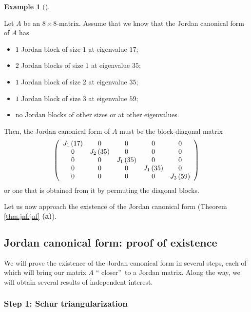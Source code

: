 \documentclass[numbers=enddot,12pt,final,onecolumn,notitlepage]{scrartcl}%
\numberwithin{exer}{subsection}
\theoremstyle{definition}
\newtheorem{exam}[theo]{Example}
\newenvironment{example}[1][]
{\begin{exam}[#1]\begin{leftbar}}
{\end{leftbar}\end{exam}}
\begin{document}
\begin{example}
Let $A$ be an $8\times8$-matrix. Assume that we know that the Jordan canonical
form of $A$ has

\begin{itemize}
\item $1$ Jordan block of size $1$ at eigenvalue $17$;

\item $2$ Jordan blocks of size $1$ at eigenvalue $35$;

\item $1$ Jordan block of size $2$ at eigenvalue $35$;

\item $1$ Jordan block of size $3$ at eigenvalue $59$;

\item no Jordan blocks of other sizes or at other eigenvalues.
\end{itemize}

Then, the Jordan canonical form of $A$ must be the block-diagonal matrix%
\[
\left(
\begin{array}
[c]{ccccc}%
J_{1}\left(  17\right)  & 0 & 0 & 0 & 0\\
0 & J_{2}\left(  35\right)  & 0 & 0 & 0\\
0 & 0 & J_{1}\left(  35\right)  & 0 & 0\\
0 & 0 & 0 & J_{1}\left(  35\right)  & 0\\
0 & 0 & 0 & 0 & J_{3}\left(  59\right)
\end{array}
\right)
\]
or one that is obtained from it by permuting the diagonal blocks.
\end{example}

Let us now approach the existence of the Jordan canonical form (Theorem
\ref{thm.jnf.jnf} \textbf{(a)}).

\subsection{\label{sect.jnf.exist}Jordan canonical form: proof of existence}

We will prove the existence of the Jordan canonical form in several steps,
each of which will bring our matrix $A$ \textquotedblleft
closer\textquotedblright\ to a Jordan matrix. Along the way, we will obtain
several results of independent interest.

\subsubsection{Step 1: Schur triangularization}
\end{document}
